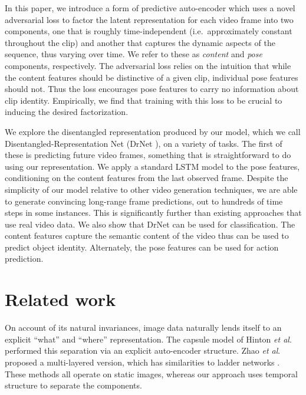 \documentclass{article}
\newcommand{\etal}{\textit{et al}.\:}
\newcommand{\drnet}{{\sc DrNet} }
\begin{document}
In this paper, we introduce a form of predictive auto-encoder which uses a novel adversarial loss to factor the latent representation for each video frame into two components, one that is roughly time-independent (i.e.~approximately constant throughout the clip) and another that captures the dynamic aspects of the sequence, thus varying over time. We refer to these as {\em content} and {\em pose} components, respectively. The adversarial loss relies on the intuition that while the content features should be distinctive of a given clip, individual pose features should not. Thus the loss encourages pose features to carry no information about clip identity. Empirically, we find that training with this loss to be crucial to inducing the desired factorization. 

We explore the disentangled representation produced by our model, which we call Disentangled-Representation Net (\drnet), on a variety of tasks. The first of these is predicting future video frames, something that is straightforward to do using our representation. We apply a standard LSTM model to the pose features, conditioning on the content features from the last observed frame. Despite the simplicity of our model relative to other video generation techniques, we are able to generate convincing long-range frame predictions, out to hundreds of time steps in some instances. This is significantly further than existing approaches that use real video data. 
We also show that \drnet can be used for classification. The content features capture the semantic content of the video thus can be used to predict object identity. Alternately, the pose features can be used for action prediction. 

\vspace{-6mm}\section{Related work}\vspace{-2mm}
On account of its natural invariances, image data naturally lends
itself to an explicit ``what'' and ``where'' representation. The
capsule model of Hinton \etal\cite{Hinton11} performed this
separation via an explicit auto-encoder structure. Zhao \etal\cite{zhao2016} proposed a multi-layered version, which has
similarities to ladder networks \cite{ramus2015}. These methods all
operate on static images, whereas our approach uses temporal structure
to separate the components.
\end{document}
